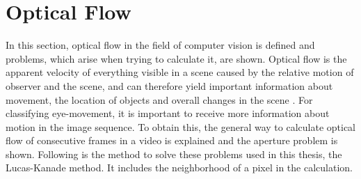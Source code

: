 \documentclass[Bachelorarbeit.tex]{subfiles}
\begin{document}
\newpage
\section{Optical Flow}
\label{Optical Flow}
In this section, optical flow in the field of computer vision is defined and problems, which arise when trying to calculate it, are shown. Optical flow is the apparent velocity of everything visible in a scene caused by the relative motion of observer and the scene, and can therefore yield important information about movement, the location of objects and overall changes in the scene \citep[p. 185]{horn1981determining}. For classifying eye-movement, it is important to receive more information about motion in the image sequence.
To obtain this, the general way to calculate optical flow of consecutive frames in a video is explained and the aperture problem is shown. Following is the method to solve these problems used in this thesis, the Lucas-Kanade method. It includes the neighborhood of a pixel in the calculation.
\end{document}

